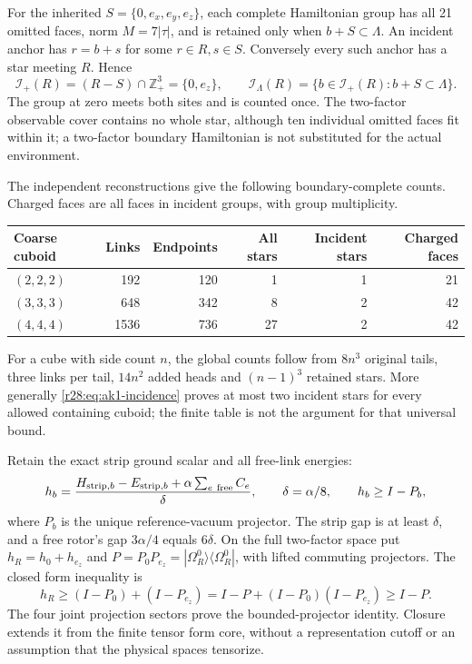 For the inherited $S=\{0,e_x,e_y,e_z\}$, each complete Hamiltonian group has all 21 omitted faces, norm $M=7|\tau|$, and is retained only when $b+S\subset\Lambda$. An incident anchor has $r=b+s$ for some $r\in R,s\in S$. Conversely every such anchor has a star meeting $R$. Hence
\begin{equation}
 \mathcal I_+(R)=(R-S)\cap\mathbb Z_+^3=\{0,e_z\},\qquad
 \mathcal I_\Lambda(R)=\{b\in\mathcal I_+(R):b+S\subset\Lambda\}.
 \label{r28:eq:ak1-incidence}
\end{equation}
The group at zero meets both sites and is counted once. The two-factor observable cover contains no whole star, although ten individual omitted faces fit within it; a two-factor boundary Hamiltonian is not substituted for the actual environment.

The independent reconstructions give the following boundary-complete counts. Charged faces are all faces in incident groups, with group multiplicity.
\begin{center}\small
\begin{tabular}{@{}lrrrrr@{}}
\toprule Coarse cuboid & Links & Endpoints & All stars & Incident stars & Charged faces \\
\midrule
$(2,2,2)$ & 192 & 120 & 1 & 1 & 21\\
$(3,3,3)$ & 648 & 342 & 8 & 2 & 42\\
$(4,4,4)$ & 1536 & 736 & 27 & 2 & 42\\
\bottomrule
\end{tabular}
\end{center}
For a cube with side count $n$, the global counts follow from $8n^3$ original tails, three links per tail, $14n^2$ added heads and $(n-1)^3$ retained stars. More generally \eqref{r28:eq:ak1-incidence} proves at most two incident stars for every allowed containing cuboid; the finite table is not the argument for that universal bound.

Retain the exact strip ground scalar and all free-link energies:
\begin{equation}
 h_b=\frac{H_{{\rm strip},b}-E_{{\rm strip},b}
                    +\alpha\sum_{e\ {\rm free}}C_e}{\delta},
 \qquad\delta=\alpha/8,\qquad h_b\ge I-P_b,
 \label{r28:eq:ak1-reference}
\end{equation}
where $P_b$ is the unique reference-vacuum projector. The strip gap is at least $\delta$, and a free rotor's gap $3\alpha/4$ equals $6\delta$. On the full two-factor space put $h_R=h_0+h_{e_z}$ and $P=P_0P_{e_z}=|\Omega_R^0\rangle\langle\Omega_R^0|$, with lifted commuting projectors. The closed form inequality is
\begin{equation}
 h_R\ge(I-P_0)+(I-P_{e_z})
      =I-P+(I-P_0)(I-P_{e_z})\ge I-P.
 \label{r28:eq:ak1-projector}
\end{equation}
The four joint projection sectors prove the bounded-projector identity. Closure extends it from the finite tensor form core, without a representation cutoff or an assumption that the physical spaces tensorize.

